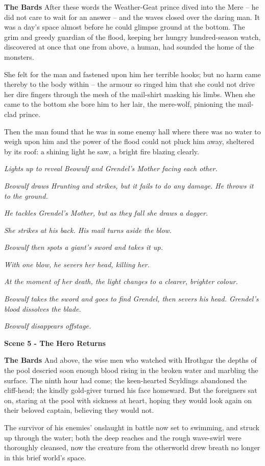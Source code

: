 \documentclass[a4paper]{article}
\begin{document}
{\textbf{The Bards} After these words the Weather-Geat prince
dived into the Mere – he did not care
to wait for an answer – and the waves closed over
the daring man. It was a day’s space almost
before he could glimpse ground at the bottom.
The grim and greedy guardian of the flood,
keeping her hungry hundred-season watch,
discovered at once that one from above,
a human, had sounded the home of the monsters.

She felt for the man and fastened upon him
her terrible hooks; but no harm came thereby
to the body within – the armour so ringed him
that she could not drive her dire fingers
through the mesh of the mail-shirt masking his limbs.
When she came to the bottom she bore him to her lair,
the mere-wolf, pinioning the mail-clad prince.

Then the man found
that he was in some enemy hall
where there was no water to weigh upon him
and the power of the flood could not pluck him away,
sheltered by its roof: a shining light he saw,
a bright fire blazing clearly.

\centerline{\textit{Lights up to reveal Beowulf and Grendel's Mother facing each other.}}

\centerline{\textit{Beowulf draws Hrunting and strikes, but it fails to do any damage. He throws it to the ground.}}
\centerline{\textit{He tackles Grendel's Mother, but as they fall she draws a dagger.}}
\centerline{\textit{She strikes at his back. His mail turns aside the blow.}}
\centerline{\textit{Beowulf then spots a giant's sword and takes it up.}}
\centerline{\textit{With one blow, he severs her head, killing her.}}

\centerline{\textit{At the moment of her death, the light changes to a clearer, brighter colour.}}
\centerline{\textit{Beowulf takes the sword and goes to find Grendel, then severs his head. Grendel's blood dissolves the blade.}}

\centerline{\textit{Beowulf disappears offstage.}}
\centerline{\textbf{Scene 5 - The Hero Returns}}

\textbf{The Bards} And above, the wise men who watched with Hrothgar
the depths of the pool descried soon enough
blood rising in the broken water
and marbling the surface. 
The ninth hour had come; the keen-hearted Scyldings
abandoned the cliff-head; the kindly gold-giver
turned his face homeward. But the foreigners sat on,
staring at the pool with sickness at heart,
hoping they would look again on their beloved captain,
believing they would not.

The survivor of his enemies’ onslaught in battle
now set to swimming, and struck up through the water;
both the deep reaches and the rough wave-swirl
were thoroughly cleansed, now the creature from the otherworld
drew breath no longer in this brief world’s space.

}
\end{document}
